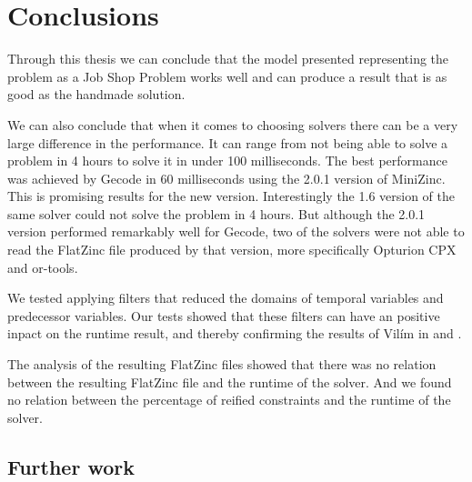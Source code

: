 \chapter{Conclusions} \label{cha:conc}
Through this thesis we can conclude that the model presented representing the problem as a Job Shop Problem works well and can produce a result that is as good as the handmade solution.

We can also conclude that when it comes to choosing solvers there can be a very large difference in the performance. It can range from not being able to solve a problem in 4 hours to solve it in under 100 milliseconds. The best performance was achieved by Gecode in 60 milliseconds using the 2.0.1 version of MiniZinc. This is promising results for the new version. Interestingly the 1.6 version of the same solver could not solve the problem in 4 hours. But although the 2.0.1 version performed remarkably well for Gecode, two of the solvers were not able to read the FlatZinc file produced by that version, more specifically Opturion CPX and or-tools.

We tested applying filters that reduced the domains of temporal variables and predecessor variables. Our tests showed that these filters can have an positive inpact on the runtime result, and thereby confirming the results of Vilím in \cite{VilimBartak2002Batch} \cite{Vilim2002Precedence} and \cite{VilimBartak2002Sequence}.

The analysis of the resulting FlatZinc files showed that there was no relation between the resulting FlatZinc file and the runtime of the solver. And we found no relation between the percentage of reified constraints and the runtime of the solver.


\section{Further work}

